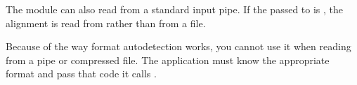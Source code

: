 The module can also read from a standard input pipe. If the
 passed to  is \ccode{-},
the alignment is read from  rather than from a file.

Because of the way format autodetection works, you cannot use it when
reading from a pipe or compressed file. The application must know the
appropriate format and pass that code it calls
.
